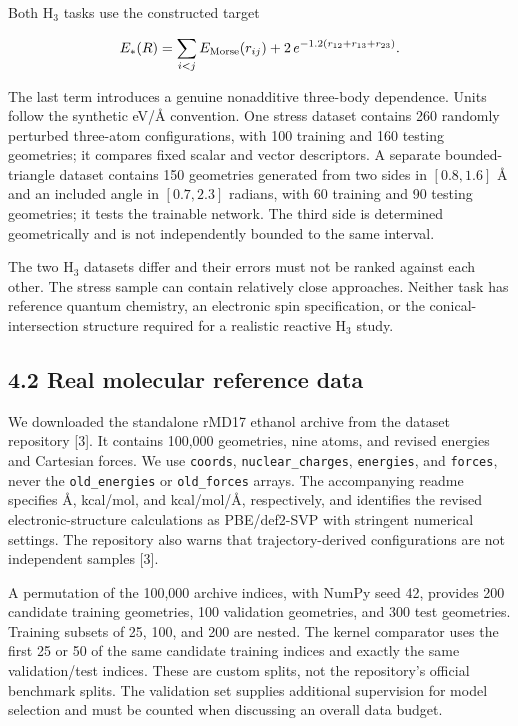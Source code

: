 \documentclass[
  11pt,
  a4paper,
]{article}
\begin{document}
Both H\(_3\) tasks use the constructed target

\[E_*(R)=\sum_{i<j}E_{\rm Morse}(r_{ij})+2\,e^{-1.2(r_{12}+r_{13}+r_{23})}.\]

The last term introduces a genuine nonadditive three-body dependence.
Units follow the synthetic eV/Å convention. One stress dataset contains
260 randomly perturbed three-atom configurations, with 100 training and
160 testing geometries; it compares fixed scalar and vector descriptors.
A separate bounded-triangle dataset contains 150 geometries generated
from two sides in \([0.8,1.6]\) Å and an included angle in \([0.7,2.3]\)
radians, with 60 training and 90 testing geometries; it tests the
trainable network. The third side is determined geometrically and is not
independently bounded to the same interval.

The two H\(_3\) datasets differ and their errors must not be ranked
against each other. The stress sample can contain relatively close
approaches. Neither task has reference quantum chemistry, an electronic
spin specification, or the conical-intersection structure required for a
realistic reactive H\(_3\) study.

\hypertarget{real-molecular-reference-data}{%
\subsection{4.2 Real molecular reference
data}\label{real-molecular-reference-data}}

We downloaded the standalone rMD17 ethanol archive from the dataset
repository {[}3{]}. It contains 100,000 geometries, nine atoms, and
revised energies and Cartesian forces. We use \texttt{coords},
\texttt{nuclear\_charges}, \texttt{energies}, and \texttt{forces}, never
the \texttt{old\_energies} or \texttt{old\_forces} arrays. The
accompanying readme specifies Å, kcal/mol, and kcal/mol/Å, respectively,
and identifies the revised electronic-structure calculations as
PBE/def2-SVP with stringent numerical settings. The repository also
warns that trajectory-derived configurations are not independent samples
{[}3{]}.

A permutation of the 100,000 archive indices, with NumPy seed 42,
provides 200 candidate training geometries, 100 validation geometries,
and 300 test geometries. Training subsets of 25, 100, and 200 are
nested. The kernel comparator uses the first 25 or 50 of the same
candidate training indices and exactly the same validation/test indices.
These are custom splits, not the repository's official benchmark splits.
The validation set supplies additional supervision for model selection
and must be counted when discussing an overall data budget.
\end{document}
